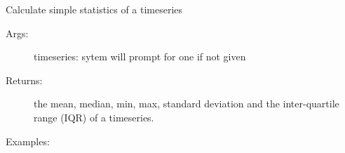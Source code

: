 \documentclass[letterpaper,10pt,english]{sphinxmanual}
\begin{document}
\begin{fulllineitems}
\label{\detokenize{Main:pyleoclim.statsTs}}
Calculate simple statistics of a timeseries
\begin{description}
\item[{Args:}] \leavevmode
timeseries: sytem will prompt for one if not given

\item[{Returns:}] \leavevmode
the mean, median, min, max, standard deviation and the
inter-quartile range (IQR) of a timeseries.

\item[{Examples:}] \leavevmode
\begin{sphinxVerbatim}[commandchars=\\\{\}]
       
\end{sphinxVerbatim}

\end{description}

\end{fulllineitems}

\end{document}
